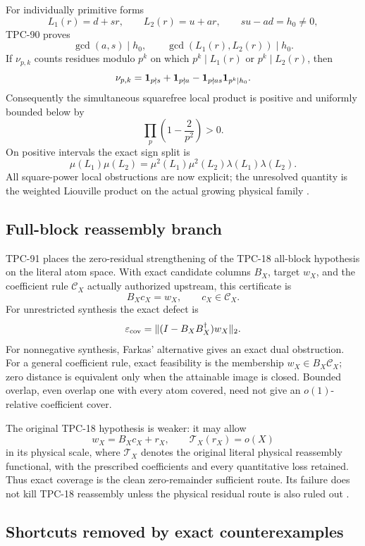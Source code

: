 For individually primitive forms
\[
 L_1(r)=d+sr,\qquad L_2(r)=u+ar,\qquad su-ad=h_0\ne0,
\]
TPC-90 proves
\[
 \gcd(a,s)\mid h_0,\qquad
 \gcd(L_1(r),L_2(r))\mid h_0.
\]
If \(\nu_{p,k}\) counts residues modulo \(p^k\) on which
\(p^k\mid L_1(r)\) or \(p^k\mid L_2(r)\), then
\[
 \nu_{p,k}
 =
 \mathbf 1_{p\nmid s}+\mathbf 1_{p\nmid a}
 -
 \mathbf 1_{p\nmid as}\mathbf 1_{p^k\mid h_0}.
\]
Consequently the simultaneous squarefree local product is positive
and uniformly bounded below by
\[
 \prod_p\left(1-\frac2{p^2}\right)>0.
\]
On positive intervals the exact sign split is
\[
 \mu(L_1)\mu(L_2)
 =
 \mu^2(L_1)\mu^2(L_2)
 \lambda(L_1)\lambda(L_2).
\]
All square-power local obstructions are now explicit; the unresolved
quantity is the weighted Liouville product on the actual growing
physical family \citep{WangTPC90}.

\subsection{Full-block reassembly branch}

TPC-91 places the zero-residual strengthening of the TPC-18
all-block hypothesis on the literal atom space.  With exact candidate
columns \(B_X\), target \(w_X\), and the coefficient rule
\(\mathscr C_X\) actually authorized upstream, this certificate is
\[
 B_Xc_X=w_X,\qquad c_X\in\mathscr C_X.
\]
For unrestricted synthesis the exact defect is
\[
 \varepsilon_{\mathrm{cov}}
 =
 \|(I-B_XB_X^\dagger)w_X\|_2.
\]
For nonnegative synthesis, Farkas' alternative gives an exact dual
obstruction.  For a general coefficient rule, exact feasibility is
the membership \(w_X\in B_X\mathscr C_X\); zero distance is equivalent
only when the attainable image is closed.  Bounded overlap, even
overlap one with every atom covered, need not give an
\(o(1)\)-relative coefficient cover.

The original TPC-18 hypothesis is weaker: it may allow
\[
 w_X=B_Xc_X+r_X,\qquad \mathcal T_X(r_X)=o(X)
\]
in its physical scale, where \(\mathcal T_X\) denotes the original
literal physical reassembly functional, with the prescribed
coefficients and every
quantitative loss retained.  Thus exact coverage is the clean
zero-remainder sufficient route.  Its failure does not kill TPC-18
reassembly unless the physical residual route is also ruled out
\citep{WangTPC18,WangTPC91}.

\subsection{Shortcuts removed by exact counterexamples}

